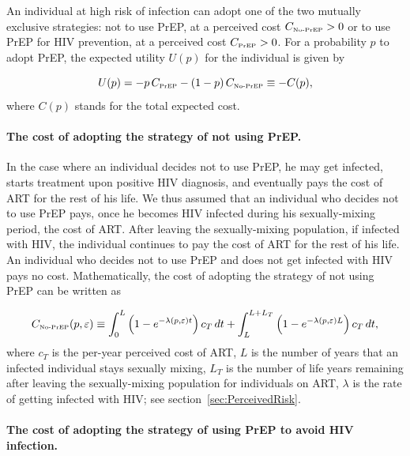 \documentclass[11pt]{article}
\begin{document}
An individual at high risk of infection can adopt one of the two mutually exclusive strategies: not to use PrEP, at a perceived cost $C_{\text{\tiny No-PrEP}}>0$ or to use PrEP for HIV prevention, at a perceived cost $C_{\text{\tiny PrEP}}>0$. For a probability $p$ to adopt PrEP, the expected utility $U(p)$ for the individual is given by 

\begin{equation}
	U(p) = - p \, C_{\text{\tiny PrEP}} - (1- p) \, C_{\text{\tiny No-PrEP}}\equiv-C(p), 
\end{equation}
where $C(p)$ stands for the total expected cost.

\paragraph{The cost of adopting the strategy of not using PrEP.}

In the case where an individual decides not to use PrEP, he may get infected, starts treatment upon positive HIV diagnosis, and eventually pays the cost of ART for the rest of his life. We thus assumed that an individual who decides not to use PrEP pays, once he becomes HIV infected during his sexually-mixing period, the cost of ART. After leaving the sexually-mixing population, if infected with HIV, the individual continues to pay the cost of ART for the rest of his life. An individual who decides not to use PrEP and does not get infected with HIV pays no cost. Mathematically, the cost of adopting the strategy of not using PrEP can be written as

\begin{equation} \label{eq:C_NoPrEP}
	C_{\text{\tiny No-PrEP}}(p,\varepsilon) \equiv \int_ 0^{L} \left(1- e^{-\lambda(p,\varepsilon) t} \right) c_T \,dt + \int_L^{L+L_T} \left(1- e^{-\lambda(p,\varepsilon) L} \right) c_T \,dt,
\end{equation}
where $c_T$ is the per-year perceived cost of ART, $L$ is the number of years that an infected individual stays sexually mixing,  $L_T$ is the number of life years remaining after leaving the sexually-mixing population for individuals on ART, $\lambda$ is the rate of getting infected with HIV; see section~\ref{sec:PerceivedRisk}.

\paragraph{The cost of adopting the strategy of using PrEP to avoid HIV infection.}
\end{document}
